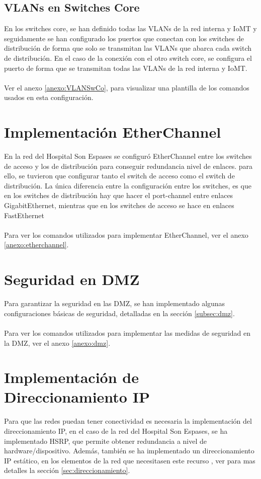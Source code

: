 \subsection{VLANs en Switches Core}
En los switches core, se han definido todas las VLANs de la red interna y IoMT y seguidamente se han configurado los puertos que conectan con los switches de distribución de forma que solo se transmitan las VLANs que abarca cada switch de distribución. En el caso de
la conexión con el otro switch core, se configura el puerto de forma que se transmitan todas las VLANs de la red interna y IoMT.
\\ \\
Ver el anexo \ref{anexo:VLANSwCo}, para visualizar una plantilla de los comandos usados en esta configuración.

\section{Implementación EtherChannel}
En la red del Hospital Son Espases se configuró EtherChannel entre los switches de acceso y los de distribución para conseguir redundancia nivel de enlaces. para ello, se tuvieron 
que configurar tanto el switch de acceso como el switch de distribución. La única diferencia entre la configuración entre los switches, es que en los switches de distribución hay que hacer el port-channel entre enlaces GigabitEthernet, mientras 
que en los switches de acceso se hace en enlaces FastEthernet 
\\ \\
Para ver los comandos utilizados para implementar EtherChannel, ver el anexo \ref{anexo:etherchannel}.

\section{Seguridad en DMZ}
Para garantizar la seguridad en las DMZ, se han implementado algunas configuraciones básicas de seguridad, detalladas en la sección \ref{subsec:dmz}.
\\ \\
Para ver los comandos utilizados para implementar las medidas de seguridad en la DMZ, ver el anexo \ref{anexo:dmz}.

\section{Implementación de Direccionamiento IP}
Para que las redes puedan tener conectividad es necesaria la implementación del direccionamiento IP, en el caso de la red del Hospital Son Espases, se ha implementado HSRP, que permite obtener redundancia a nivel de hardware/dispositivo.
Además, también se ha implementado un direccionamiento IP estático, en los elementos de la red que necesitasen este recurso , ver para mas detalles la sección \ref{sec:direccionamiento}.
